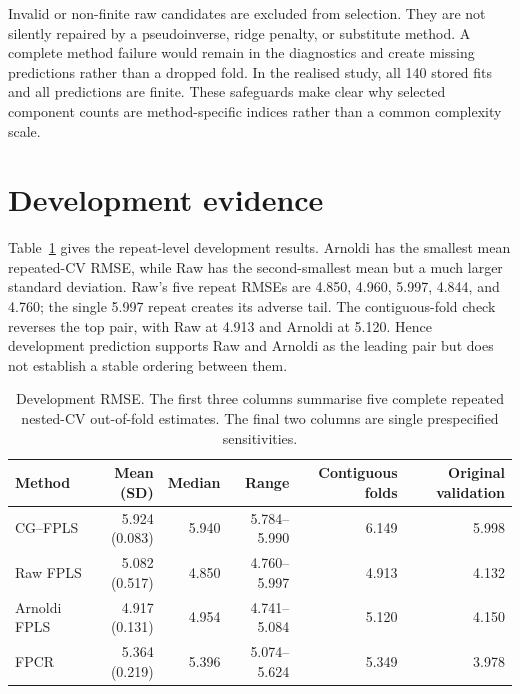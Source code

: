 Invalid or non-finite raw candidates are excluded from selection.  They are not
silently repaired by a pseudoinverse, ridge penalty, or substitute method.  A
complete method failure would remain in the diagnostics and create missing
predictions rather than a dropped fold.  In the realised study, all 140 stored
fits and all predictions are finite.  These safeguards make clear why selected
component counts are method-specific indices rather than a common complexity
scale.

\section{Development evidence}
\label{sec:app-spectroscopy-development}

Table~\ref{tab:app-spectroscopy-development-rmse} gives the repeat-level
development results.  Arnoldi has the smallest mean repeated-CV RMSE, while
Raw has the second-smallest mean but a much larger standard deviation.  Raw's
five repeat RMSEs are 4.850, 4.960, 5.997, 4.844, and 4.760; the single 5.997
repeat creates its adverse tail.  The contiguous-fold check reverses the top
pair, with Raw at 4.913 and Arnoldi at 5.120.  Hence development prediction
supports Raw and Arnoldi as the leading pair but does not establish a stable
ordering between them.

\begin{table}[htbp]
    \centering
    \small
    \caption[Repeated-development prediction errors]{Development RMSE.  The first three columns summarise five complete
    repeated nested-CV out-of-fold estimates.  The final two columns are single
    prespecified sensitivities.}
    \label{tab:app-spectroscopy-development-rmse}
    \begin{tabular}{@{}lrrrrr@{}}
        \toprule
        Method & Mean (SD) & Median & Range & Contiguous folds & Original validation \\
        \midrule
        CG--FPLS     & 5.924 (0.083) & 5.940 & 5.784--5.990 & 6.149 & 5.998 \\
        Raw FPLS     & 5.082 (0.517) & 4.850 & 4.760--5.997 & 4.913 & 4.132 \\
        Arnoldi FPLS & 4.917 (0.131) & 4.954 & 4.741--5.084 & 5.120 & 4.150 \\
        FPCR         & 5.364 (0.219) & 5.396 & 5.074--5.624 & 5.349 & 3.978 \\
        \bottomrule
    \end{tabular}
\end{table}

